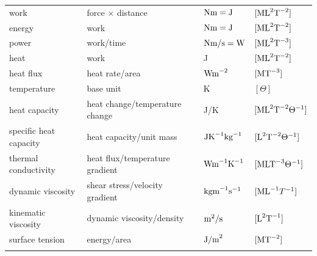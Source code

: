 \documentclass[graybox,envcountchap,sectrefs,final]{svmonodo}
\begin{document}
{\begin{tabular}{llll}
work                                 & force $\times$ distance                  & $\hbox{Nm} = \hbox{J}$         & $[\hbox{ML}^2\hbox{T}^{-2}]$            \\
energy                               & work                                     & $\hbox{Nm} = \hbox{J}$         & $[\hbox{ML}^2\hbox{T}^{-2}]$            \\
power                                & work/time                                & $\hbox{Nm/s} = \hbox{W}$       & $[\hbox{ML}^2\hbox{T}^{-3}]$            \\
heat                                 & work                                     & J                              & $[\hbox{ML}^2\hbox{T}^{-2}]$            \\
heat flux                            & heat rate/area                           & $\hbox{Wm}^{-2}$               & $[\hbox{MT}^{-3}]$                      \\
temperature                          & base unit                                & K                              & $[\Theta]$                              \\
heat capacity                        & heat change/temperature change           & J/K                            & $[\hbox{ML}^2\hbox{T}^{-2}\Theta^{-1}]$ \\
specific heat capacity               & heat capacity/unit mass                  & $\hbox{JK}^{-1}\hbox{kg}^{-1}$ & $[\hbox{L}^2\hbox{T}^{-2}\Theta^{-1}]$  \\
thermal conductivity                 & heat flux/temperature gradient           & $\hbox{Wm}^{-1}\hbox{K}^{-1}$  & $[\hbox{MLT}^{-3}\Theta^{-1}]$          \\
dynamic viscosity                    & shear stress/velocity gradient           & $\hbox{kgm}^{-1}\hbox{s}^{-1}$ & $[\hbox{ML}^{-1}T^{-1}]$                \\
kinematic viscosity                  & dynamic viscosity/density                & $\hbox{m}^2/\hbox{s}$          & $[\hbox{L}^2\hbox{T}^{-1}]$             \\
surface tension                      & energy/area                              & $\hbox{J/m}^2$                 & $[\hbox{MT}^{-2}]$                      \\
\noalign{\smallskip}\hline\noalign{\smallskip}
\end{tabular}

\vspace{4mm}

}
\end{document}
